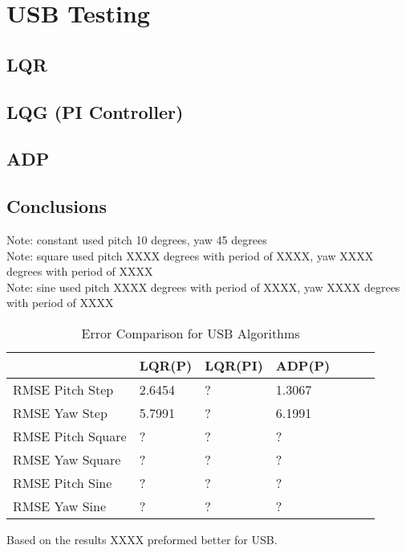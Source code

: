 \chapter{USB Testing}

\section{LQR}

\section{LQG (PI Controller)}

\section{ADP}

\section{Conclusions}
Note: constant used pitch 10 degrees, yaw 45 degrees\\
Note: square used pitch XXXX degrees with period of XXXX, yaw XXXX degrees with period of XXXX\\
Note: sine used pitch XXXX degrees with period of XXXX, yaw XXXX degrees with period of XXXX\\
\begin{table}[h!]
    \centering
    \begin{tabular}{l|l|l|l|l|l|l}
        \toprule
        \textbf{} & \textbf{LQR(P)} & \textbf{LQR(PI)} &
        \textbf{ADP(P)} \\
        \toprule
        RMSE Pitch Step & 2.6454 & ? & 1.3067 \\
        RMSE Yaw Step & 5.7991 & ? & 6.1991 \\
        RMSE Pitch Square & ? & ? & ? \\
        RMSE Yaw Square & ? & ? & ? \\
        RMSE Pitch Sine & ? & ? & ? \\
        RMSE Yaw Sine & ? & ? & ? \\
        \bottomrule
    \end{tabular}
    \caption{Error Comparison for USB Algorithms}
    \label{tab:USB_RMSE}
\end{table}
Based on the results XXXX preformed better for USB.

